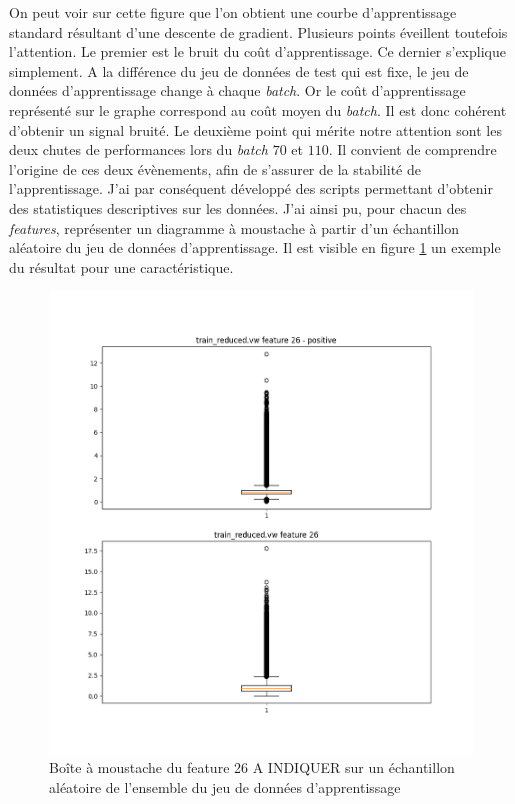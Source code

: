         On peut voir sur cette figure que l'on obtient une courbe d'apprentissage standard résultant d'une descente de gradient. Plusieurs points éveillent toutefois l'attention. Le premier est le bruit du coût d'apprentissage. Ce dernier s'explique simplement. A la différence du jeu de données de test qui est fixe, le jeu de données d'apprentissage change à chaque \emph{batch}. Or le coût d'apprentissage représenté sur le graphe correspond au coût moyen du \emph{batch}. Il est donc cohérent d'obtenir un signal bruité. Le deuxième point qui mérite notre attention sont les deux chutes de performances lors du \emph{batch} $70$ et $110$. Il convient de comprendre l'origine de ces deux évènements, afin de s'assurer de la stabilité de l'apprentissage. J'ai par conséquent développé des scripts permettant d'obtenir des statistiques descriptives sur les données. J'ai ainsi pu, pour chacun des \emph{features}, représenter un diagramme à moustache à partir d'un échantillon aléatoire du jeu de données d'apprentissage. Il est visible en figure \ref{fig:box-plot-train} un exemple du résultat pour une caractéristique. 
        \begin{figure}[h]
            \centering
            \includegraphics[scale=0.50]{images/all_26.png}
            \caption{Boîte à moustache du feature 26 A INDIQUER sur un échantillon aléatoire de l'ensemble du jeu de données d'apprentissage}
            \label{fig:box-plot-train}
        \end{figure}
